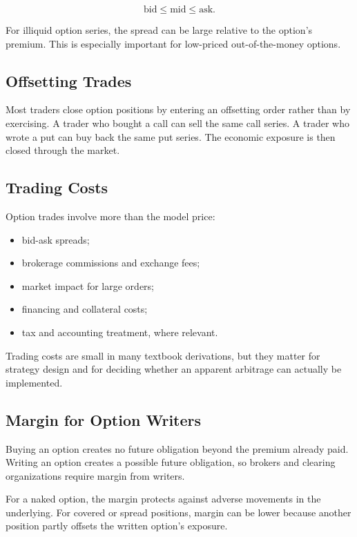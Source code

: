 \[
    \text{bid} \leq \text{mid} \leq \text{ask}.
\]

For illiquid option series, the spread can be large relative to the option's
premium. This is especially important for low-priced out-of-the-money options.

\subsection{Offsetting Trades}

Most traders close option positions by entering an offsetting order rather than
by exercising. A trader who bought a call can sell the same call series. A trader
who wrote a put can buy back the same put series. The economic exposure is then
closed through the market.

\subsection{Trading Costs}

Option trades involve more than the model price:
\begin{itemize}
    \item bid-ask spreads;
    \item brokerage commissions and exchange fees;
    \item market impact for large orders;
    \item financing and collateral costs;
    \item tax and accounting treatment, where relevant.
\end{itemize}

Trading costs are small in many textbook derivations, but they matter for
strategy design and for deciding whether an apparent arbitrage can actually be
implemented.

\subsection{Margin for Option Writers}

Buying an option creates no future obligation beyond the premium already paid.
Writing an option creates a possible future obligation, so brokers and clearing
organizations require margin from writers.

For a naked option, the margin protects against adverse movements in the
underlying. For covered or spread positions, margin can be lower because another
position partly offsets the written option's exposure.

